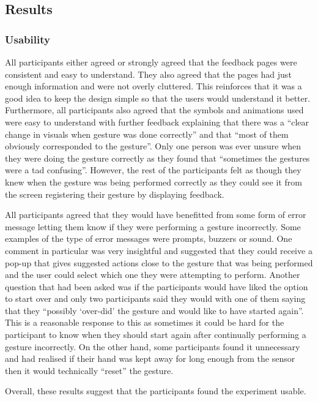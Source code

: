 \documentclass{l4proj}
\begin{document}
\subsection{Results}
\subsubsection{Usability} 

All participants either agreed or strongly agreed that the feedback pages were consistent and easy to understand. They also agreed that the pages had just enough information and were not overly cluttered. This reinforces that it was a good idea to keep the design simple so that the users would understand it better. Furthermore, all participants also agreed that the symbols and animations used were easy to understand with further feedback explaining that there was a “clear change in visuals when gesture was done correctly” and that “most of them obviously corresponded to the gesture”. Only one person was ever unsure when they were doing the gesture correctly as they found that “sometimes the gestures were a tad confusing”. However, the rest of the participants felt as though they knew when the gesture was being performed correctly as they could see it from the screen registering their gesture by displaying feedback. 

All participants agreed that they would have benefitted from some form of error message letting them know if they were performing a gesture incorrectly. Some examples of the type of error messages were prompts, buzzers or sound. One comment in particular was very insightful and suggested that they could receive a pop-up that gives suggested actions close to the gesture that was being performed and the user could select which one they were attempting to perform. Another question that had been asked was if the participants would have liked the option to start over and only two participants said they would with one of them saying that they “possibly ‘over-did’ the gesture and would like to have started again”. This is a reasonable response to this as sometimes it could be hard for the participant to know when they should start again after continually performing a gesture incorrectly. On the other hand, some participants found it unnecessary  and had realised if their hand was kept away for long enough from the sensor then it would technically “reset” the gesture. 

Overall, these results suggest that the participants found the experiment usable.
\end{document}
